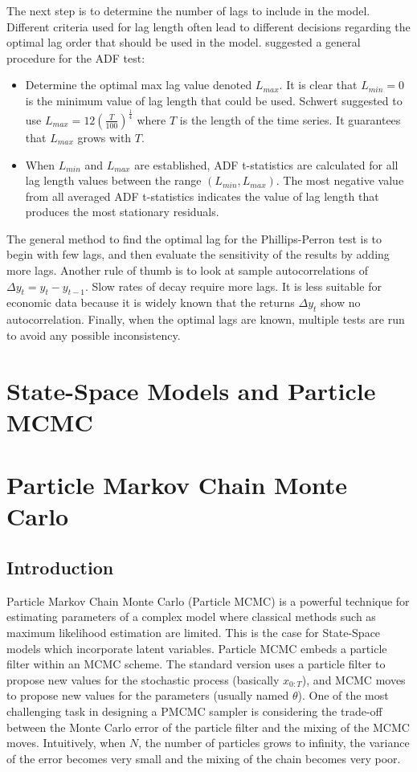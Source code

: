 \documentclass[11pt,a4,twosided,singlespacing,titlepagenumber=on]{scrreprt}
\numberwithin{equation}{chapter} %
\theoremstyle{remark}
\begin{document}
The next step is to determine the number of lags to include in the model. Different criteria used for lag length often lead to different decisions regarding the optimal lag order that should be used in the model. \cite{daoimpact} suggested a general procedure for the ADF test:
\begin{itemize}
\item Determine the optimal max lag value denoted $L_{max}$. It is clear that $L_{min} = 0$ is the minimum value of lag length that could be used. Schwert suggested to use $L_{max} = 12 \left(\frac{T}{100} \right)^{\frac{1}{4}}$ where $T$ is the length of the time series. It guarantees that $L_{max}$ grows with $T$.
\item When $L_{min}$ and $L_{max}$ are established, ADF t-statistics are calculated for all lag length values between the range $(L_{min}, L_{max})$. The most negative value from all averaged ADF t-statistics indicates the value of lag length that produces the most stationary residuals.
\end{itemize}
The general method to find the optimal lag for the Phillips-Perron test is to begin with few lags, and then evaluate the sensitivity of the results by adding more lags. Another rule of thumb is to look at sample autocorrelations of $\Delta y_t = y_t - y_{t-1}$. Slow rates of decay require more lags. It is less suitable for economic data because it is widely known that the returns $\Delta y_t$ show no autocorrelation. Finally, when the optimal lags are known, multiple tests are run to avoid any possible inconsistency.

\chapter{State-Space Models and Particle MCMC}

\chapter{Particle Markov Chain Monte Carlo}

\section{Introduction}
Particle Markov Chain Monte Carlo (Particle MCMC) is a powerful technique for estimating parameters of a complex model where classical methods such as maximum likelihood estimation are limited. This is the case for State-Space models which incorporate latent variables. Particle MCMC embeds a particle filter within an MCMC scheme. The standard version uses a particle filter to propose new values for the stochastic process (basically $x_{0:T}$), and MCMC moves to propose new values for the parameters (usually named $\theta$). One of the most challenging task in designing a PMCMC sampler is considering the trade-off between the Monte Carlo error of the particle filter and the mixing of the MCMC moves. Intuitively, when $N$, the number of particles grows to infinity, the variance of the error becomes very small and the mixing of the chain becomes very poor.
\end{document}
